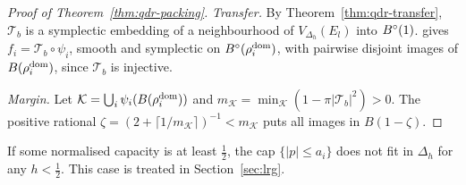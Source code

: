 \begin{proof}[Proof of Theorem~\ref{thm:qdr-packing}]
\emph{Transfer.} By Theorem~\ref{thm:qdr-transfer}, $\mathcal T_b$ is a symplectic embedding of a neighbourhood of
$V_{\Delta_h}(E_l)$ into $B^{\circ}(1)$.  gives $f_i=\mathcal T_b\circ\psi_i$, smooth and
symplectic on $B^{\circ}(\rho_i^{\rm dom})$, with pairwise disjoint images of $B(\rho_i^{\rm dom})$, since $\mathcal T_b$ is injective.

\emph{Margin.} Let $\mathcal K=\bigcup_i\psi_i(B(\rho_i^{\rm dom}))$ and $m_{\mathcal K}=\min_{\mathcal K}(1-\pi|\mathcal
T_b|^2)>0$. The positive rational $\zeta=(2+\lceil1/m_{\mathcal K}\rceil)^{-1}<m_{\mathcal K}$ puts all images in $B(1-\zeta)$.
\end{proof}

If some normalised capacity is at least $\frac12$, the cap $\{|p|\le a_i\}$ does not fit in $\Delta_h$ for any $h<\frac12$. This
case is treated in Section~\ref{sec:lrg}.
